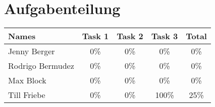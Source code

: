 \newpage
\section{Aufgabenteilung}
\begin{table}[htpb]
    \center
	\label{tab:Aufgabenteilung}
    \begin{tabular}{l|c|c|c|c}
        \large{Names}    & \large{Task 1} & \large{Task 2} & \large{Task 3} & \large{Total} \\ \hline
        Jenny Berger     &            0\% &            0\% &            0\% &           0\% \\
        Rodrigo Bermudez &            0\% &            0\% &            0\% &           0\% \\
        Max Block        &            0\% &            0\% &            0\% &           0\% \\
        Till Friebe      &            0\% &            0\% &          100\% &          25\%
    \end{tabular}

\end{table}
